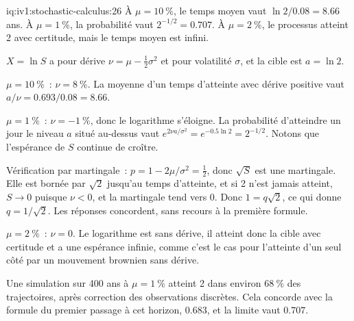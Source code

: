 \begin{solution}{iq:iv1:stochastic-calculus:26}
À $\mu = 10~\%$, le temps moyen vaut $\ln 2/0.08 = 8.66$ ans. À $\mu = 1~\%$, la probabilité vaut $2^{-1/2} = 0.707$. À $\mu = 2~\%$, le processus atteint 2 avec certitude, mais le temps moyen est infini.

$X = \ln S$ a pour dérive $\nu = \mu - \frac12\sigma^2$ et pour volatilité $\sigma$, et la cible est $a = \ln 2$.

$\mu = 10~\%$~: $\nu = 8~\%$. La moyenne d'un temps d'atteinte avec dérive positive vaut $a/\nu = 0.693/0.08 = 8.66$.

$\mu = 1~\%$~: $\nu = -1~\%$, donc le logarithme s'éloigne. La probabilité d'atteindre un jour le niveau $a$ situé au-dessus vaut $e^{2\nu a/\sigma^2} = e^{-0.5\ln 2} = 2^{-1/2}$. Notons que l'espérance de $S$ continue de croître.

Vérification par martingale~: $p = 1 - 2\mu/\sigma^2 = \frac12$, donc $\sqrt{S}$ est une martingale. Elle est bornée par $\sqrt{2}$ jusqu'au temps d'atteinte, et si 2 n'est jamais atteint, $S \to 0$ puisque $\nu < 0$, et la martingale tend vers 0. Donc $1 = q\sqrt{2}$, ce qui donne $q = 1/\sqrt{2}$. Les réponses concordent, sans recours à la première formule.

$\mu = 2~\%$~: $\nu = 0$. Le logarithme est sans dérive, il atteint donc la cible avec certitude et a une espérance infinie, comme c'est le cas pour l'atteinte d'un seul côté par un mouvement brownien sans dérive.

Une simulation sur 400 ans à $\mu = 1~\%$ atteint 2 dans environ $68~\%$ des trajectoires, après correction des observations discrètes. Cela concorde avec la formule du premier passage à cet horizon, $0.683$, et la limite vaut $0.707$.



\end{solution}


